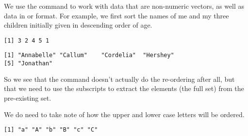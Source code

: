  
We use the  command to work with data that are non-numeric vectors, as well as data in  or  format. For example, we first sort the names of me and my three children initially given in descending order of age. 
\begin{knitrout}
\color{fgcolor}\begin{kframe}
\begin{alltt}
\hlstd{> }\hlkwb{=}\hlstd{(}\hlstd{,} \hlstd{,} \hlstd{,} \hlstd{,} \hlstd{)}
\hlstd{> }
\end{alltt}
\begin{verbatim}
[1] 3 2 4 5 1
\end{verbatim}
\begin{alltt}
\hlstd{> }\hlstd{Home[}\hlstd{(Home)]}
\end{alltt}
\begin{verbatim}
[1] "Annabelle" "Callum"    "Cordelia"  "Hershey"  
[5] "Jonathan" 
\end{verbatim}
\end{kframe}
\end{knitrout}
 
So we see that the  command doesn't actually do the re-ordering after all, but that we need to use the subscripts to extract the elements (the full set) from the pre-existing set. 
 
We do need to take note of how the upper and lower case letters will be ordered. 
\begin{knitrout}
\color{fgcolor}\begin{kframe}
\begin{alltt}
\hlstd{> }\hlkwb{=}\hlstd{(}\hlstd{,} \hlstd{,} \hlstd{,} \hlstd{,} \hlstd{,} \hlstd{)}
\hlstd{> }\hlstd{SomeLetters[}\hlstd{(SomeLetters)]}
\end{alltt}
\begin{verbatim}
[1] "a" "A" "b" "B" "c" "C"
\end{verbatim}
\end{kframe}
\end{knitrout}
 
